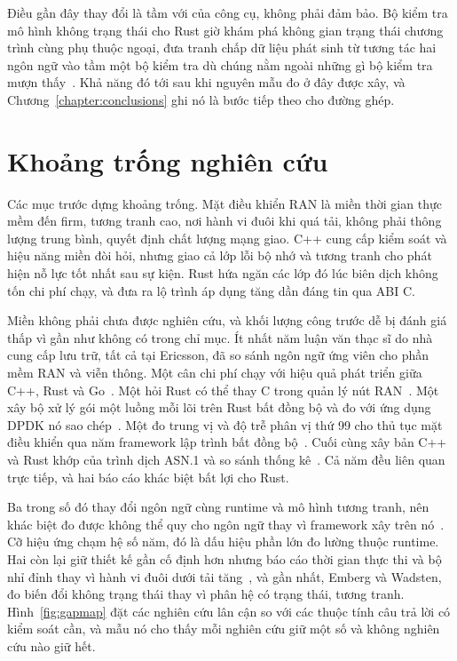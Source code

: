 Điều gần đây thay đổi là tầm với của công cụ, không phải đảm bảo. Bộ kiểm tra mô hình không
trạng thái cho Rust giờ khám phá không gian trạng thái chương trình cùng phụ thuộc ngoại, đưa
tranh chấp dữ liệu phát sinh từ tương tác hai ngôn ngữ vào tầm một bộ kiểm tra dù chúng nằm
ngoài những gì bộ kiểm tra mượn
thấy~\cite{pearce2026rustmc}. Khả năng đó tới sau khi nguyên mẫu đo ở đây được xây, và
Chương~\ref{chapter:conclusions} ghi nó là bước tiếp theo cho đường ghép.

\section{Khoảng trống nghiên cứu}\label{sec:gap}
Các mục trước dựng khoảng trống. Mặt điều khiển RAN là miền thời gian thực mềm đến firm, tương
tranh cao, nơi hành vi đuôi khi quá tải, không phải thông lượng trung bình, quyết định chất
lượng mạng giao. C++ cung cấp kiểm soát và hiệu năng miền đòi hỏi, nhưng giao cả lớp lỗi bộ nhớ
và tương tranh cho phát hiện nỗ lực tốt nhất sau sự kiện. Rust hứa ngăn các lớp đó lúc biên
dịch không tốn chi phí chạy, và đưa ra lộ trình áp dụng tăng dần đáng tin qua ABI C.

Miền không phải chưa được nghiên cứu, và khối lượng công trước dễ bị đánh giá thấp vì gần như
không có trong chỉ mục. Ít nhất năm luận văn thạc sĩ do nhà cung cấp lưu trữ, tất cả tại
Ericsson, đã so sánh ngôn ngữ ứng viên cho phần mềm RAN và viễn thông. Một cân chi phí chạy với
hiệu quả phát triển giữa C++, Rust và Go~\cite{karlback2021ran}. Một hỏi Rust có thể thay C
trong quản lý nút RAN~\cite{olsson2023ranmgmt}. Một xây bộ xử lý gói một luồng mỗi lõi trên
Rust bất đồng bộ và đo với ứng dụng DPDK nó sao
chép~\cite{olsson2023asyncpackets}. Một đo trung vị và độ trễ phân vị thứ 99 cho thủ tục mặt
điều khiển qua năm framework lập trình
bất đồng bộ~\cite{arvidsson2025async}. Cuối cùng xây bản C++ và Rust khớp của trình dịch ASN.1
và so sánh thống kê~\cite{emberg2023asn1}. Cả năm đều liên quan trực tiếp, và hai báo cáo khác
biệt bất lợi cho Rust.

Ba trong số đó thay đổi ngôn ngữ cùng runtime và mô hình tương tranh, nên khác biệt đo được
không thể quy cho ngôn ngữ thay vì framework xây trên
nó~\cite{karlback2021ran,olsson2023asyncpackets,arvidsson2025async}. Cỡ hiệu ứng chạm hệ số năm,
đó là dấu hiệu phần lớn đo lường thuộc runtime. Hai còn lại giữ thiết kế gần cố định hơn nhưng
báo cáo thời gian thực thi và bộ nhỉ đỉnh thay vì hành vi đuôi dưới tải tăng~\cite{olsson2023ranmgmt,emberg2023asn1},
và gần nhất, Emberg và Wadsten, đo biến đổi không trạng thái thay vì phân hệ có trạng thái,
tương tranh. Hình~\ref{fig:gapmap} đặt các nghiên cứu lân cận so với các thuộc tính câu trả lời
có kiểm soát cần, và mẫu nó cho thấy mỗi nghiên cứu giữ một số và không nghiên cứu nào giữ
hết.

